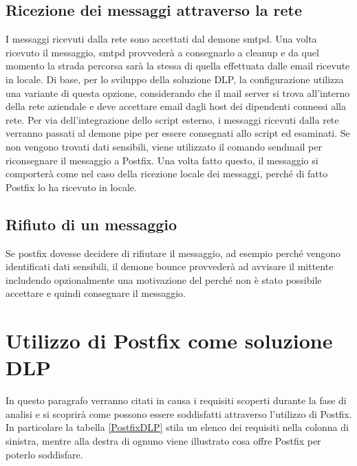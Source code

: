   \subsection{Ricezione dei messaggi attraverso la rete}
  I messaggi ricevuti dalla rete sono accettati dal demone smtpd. Una volta ricevuto il messaggio, smtpd provvederà a consegnarlo a cleanup e da quel momento la strada percorsa sarà la stessa di quella effettuata dalle email ricevute in locale.
  Di base, per lo sviluppo della soluzione DLP, la configurazione utilizza una variante di questa opzione, considerando che il mail server si trova all'interno della rete aziendale e deve accettare email dagli host dei dipendenti connessi alla rete.
  Per via dell'integrazione dello script esterno, i messaggi ricevuti dalla rete verranno passati al demone pipe per essere consegnati allo script ed esaminati.
  Se non vengono trovati dati sensibili, viene utilizzato il comando sendmail per riconsegnare il messaggio a Postfix. Una volta fatto questo,
  il messaggio si comporterà come nel caso della ricezione locale dei messaggi, perché di fatto Postfix lo ha ricevuto in locale.
  
  \subsection{Rifiuto di un messaggio}
  Se postfix dovesse decidere di rifiutare il messaggio, ad esempio perché vengono identificati dati sensibili, il demone bounce provvederà ad avvisare il mittente includendo opzionalmente una motivazione del perché non è stato possibile accettare e quindi consegnare il messaggio.
  
  \section{Utilizzo di Postfix come soluzione DLP}
  In questo paragrafo verranno citati in causa i requisiti scoperti durante la fase di analisi e si scoprirà come
  possono essere soddisfatti attraverso l'utilizzo di Postfix. In particolare la tabella
  \ref{PostfixDLP} stila un elenco dei requisiti nella colonna di sinistra, mentre alla destra di ognuno viene illustrato
  cosa offre Postfix per poterlo soddisfare.
  
   
  
  
  

